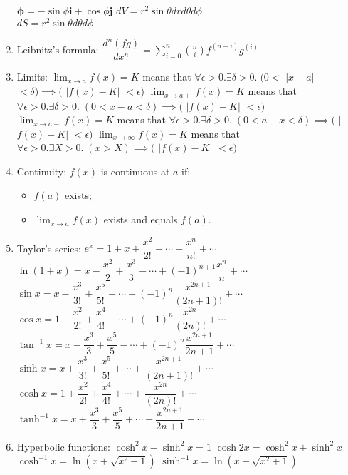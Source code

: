 \documentclass[fleqn]{article}
\begin{document}
\begin{enumerate}
        $\bm{\hat{\phi}}=-\sin\phi\bm{i}+\cos\phi\bm{j}$\smallbreak
        $dV=r^2\sin\theta dr d\theta d\phi$\\
        $dS=r^2\sin\theta d\theta d\phi$
    \item Leibnitz's formula:\smallbreak
        $\dfrac{d^n(fg)}{dx^n}=\displaystyle\sum_{i=0}^{n}\binom{n}{i}f^{(n-i)}g^{(i)}$
    \item Limits: \smallbreak
        $\displaystyle\lim_{x\to a}f(x)=K$ means that
        $\forall\epsilon>0.\exists\delta>0.\;(0<$ $|$$x-a$$|$ $<\delta)\implies($ $|$$f(x)-K$$|$ $<\epsilon)$\smallbreak
        $\displaystyle\lim_{x\to a+}f(x)=K$ means that
        $\forall\epsilon>0.\exists\delta>0.\;(0<x-a<\delta)\implies($ $|$$f(x)-K$$|$ $<\epsilon)$\smallbreak
        $\displaystyle\lim_{x\to a-}f(x)=K$ means that
        $\forall\epsilon>0.\exists\delta>0.\;(0<a-x<\delta)\implies($ $|$$f(x)-K$$|$ $<\epsilon)$\smallbreak
        $\displaystyle\lim_{x\to\infty}f(x)=K$ means that
        $\forall\epsilon>0.\exists X>0.\;(x>X)\implies($ $|$$f(x)-K$$|$ $<\epsilon)$
    \item Continuity: $f(x)$ is continuous at $a$ if:
        \begin{itemize}
            \item $f(a)$ exists;
            \item $\displaystyle\lim_{x\to a}f(x)$ exists and equals $f(a)$.
        \end{itemize}
    \newpage
    \item Taylor's series:\smallbreak
        $e^x=1+x+\dfrac{x^2}{2!}+\cdots+\dfrac{x^n}{n!}+\cdots$\smallbreak
        $\ln(1+x)=x-\dfrac{x^2}{2}+\dfrac{x^3}{3}-\cdots+(-1)^{n+1}\dfrac{x^n}{n}+\cdots$\smallbreak
        $\sin x=x-\dfrac{x^3}{3!}+\dfrac{x^5}{5!}-\cdots+(-1)^n\dfrac{x^{2n+1}}{(2n+1)!}+\cdots$\smallbreak
        $\cos x=1-\dfrac{x^2}{2!}+\dfrac{x^4}{4!}-\cdots+(-1)^n\dfrac{x^{2n}}{(2n)!}+\cdots$\smallbreak
        $\tan^{-1}x=x-\dfrac{x^3}{3}+\dfrac{x^5}{5}-\cdots+(-1)^n\dfrac{x^{2n+1}}{2n+1}+\cdots$\smallbreak
        $\sinh x=x+\dfrac{x^3}{3!}+\dfrac{x^5}{5!}+\cdots+\dfrac{x^{2n+1}}{(2n+1)!}+\cdots$\smallbreak
        $\cosh x=1+\dfrac{x^2}{2!}+\dfrac{x^4}{4!}+\cdots+\dfrac{x^{2n}}{(2n)!}+\cdots$\smallbreak
        $\tanh^{-1}x=x+\dfrac{x^3}{3}+\dfrac{x^5}{5}+\cdots+\dfrac{x^{2n+1}}{2n+1}+\cdots$
    \item Hyperbolic functions:\smallbreak
        $\cosh^2 x-\sinh^2 x=1$\smallbreak
        $\cosh2x=\cosh^2 x+\sinh^2 x$\smallbreak
        $\cosh^{-1}x=\ln(x+\sqrt{x^2-1})$\smallbreak
        $\sinh^{-1}x=\ln(x+\sqrt{x^2+1})$\smallbreak

\end{enumerate}
\end{document}

